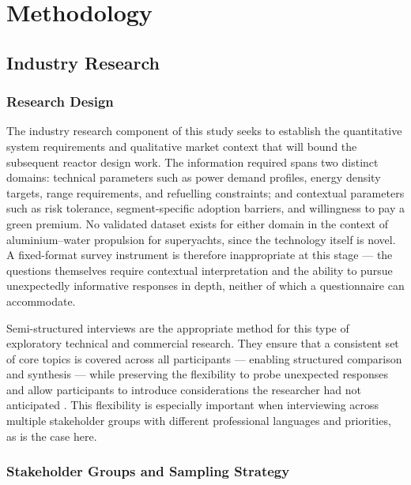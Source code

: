 \documentclass[12pt]{article}
\begin{document}
\break

\section{Methodology}

\subsection{Industry Research}
\label{sec:industry-research}

\subsubsection*{Research Design}

The industry research component of this study seeks to establish the quantitative 
system requirements and qualitative market context that will bound the subsequent 
reactor design work. The information required spans two distinct domains: technical 
parameters such as power demand profiles, energy density targets, range requirements, 
and refuelling constraints; and contextual parameters such as risk tolerance, 
segment-specific adoption barriers, and willingness to pay a green premium. No 
validated dataset exists for either domain in the context of aluminium--water 
propulsion for superyachts, since the technology itself is novel. A fixed-format 
survey instrument is therefore inappropriate at this stage --- the questions 
themselves require contextual interpretation and the ability to pursue unexpectedly 
informative responses in depth, neither of which a questionnaire can accommodate.

Semi-structured interviews are the appropriate method for this type of exploratory 
technical and commercial research. They ensure that a consistent set of core topics 
is covered across all participants --- enabling structured comparison and synthesis 
--- while preserving the flexibility to probe unexpected responses and allow 
participants to introduce considerations the researcher had not anticipated 
\cite{kvale2009}. This flexibility is especially important when interviewing across 
multiple stakeholder groups with different professional languages and priorities, as 
is the case here.

\subsubsection*{Stakeholder Groups and Sampling Strategy}
\end{document}
